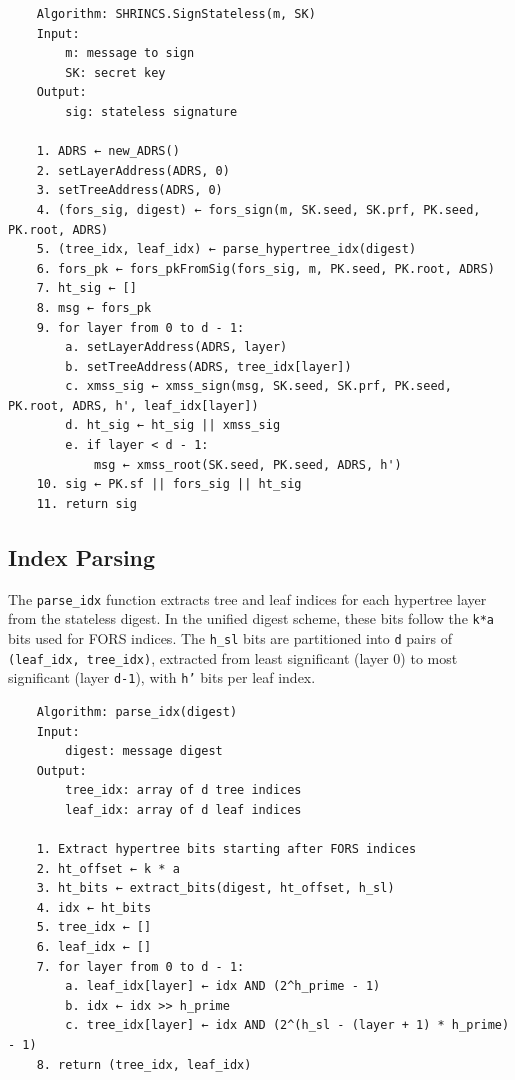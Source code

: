 \begin{verbatim}
    Algorithm: SHRINCS.SignStateless(m, SK)
    Input:
        m: message to sign
        SK: secret key
    Output:
        sig: stateless signature

    1. ADRS ← new_ADRS()
    2. setLayerAddress(ADRS, 0)
    3. setTreeAddress(ADRS, 0)  
    4. (fors_sig, digest) ← fors_sign(m, SK.seed, SK.prf, PK.seed, PK.root, ADRS)
    5. (tree_idx, leaf_idx) ← parse_hypertree_idx(digest)
    6. fors_pk ← fors_pkFromSig(fors_sig, m, PK.seed, PK.root, ADRS)
    7. ht_sig ← []
    8. msg ← fors_pk
    9. for layer from 0 to d - 1:
        a. setLayerAddress(ADRS, layer)
        b. setTreeAddress(ADRS, tree_idx[layer])
        c. xmss_sig ← xmss_sign(msg, SK.seed, SK.prf, PK.seed, PK.root, ADRS, h', leaf_idx[layer])
        d. ht_sig ← ht_sig || xmss_sig
        e. if layer < d - 1:
            msg ← xmss_root(SK.seed, PK.seed, ADRS, h')
    10. sig ← PK.sf || fors_sig || ht_sig
    11. return sig
\end{verbatim}

\subsection{Index Parsing}
The \texttt{parse\_idx} function extracts tree and leaf indices for each hypertree layer from the stateless digest. In the unified digest scheme, these bits follow the \texttt{k*a} bits used for FORS indices. The \texttt{h\_sl} bits are partitioned into \texttt{d} pairs of \texttt{(leaf\_idx, tree\_idx)}, extracted from least significant (layer 0) to most significant (layer \texttt{d-1}), with \texttt{h'} bits per leaf index.
\begin{verbatim}
    Algorithm: parse_idx(digest)
    Input:
        digest: message digest
    Output:
        tree_idx: array of d tree indices
        leaf_idx: array of d leaf indices

    1. Extract hypertree bits starting after FORS indices
    2. ht_offset ← k * a
    3. ht_bits ← extract_bits(digest, ht_offset, h_sl)
    4. idx ← ht_bits 
    5. tree_idx ← []
    6. leaf_idx ← []
    7. for layer from 0 to d - 1:
        a. leaf_idx[layer] ← idx AND (2^h_prime - 1)
        b. idx ← idx >> h_prime
        c. tree_idx[layer] ← idx AND (2^(h_sl - (layer + 1) * h_prime) - 1)
    8. return (tree_idx, leaf_idx)
\end{verbatim}
